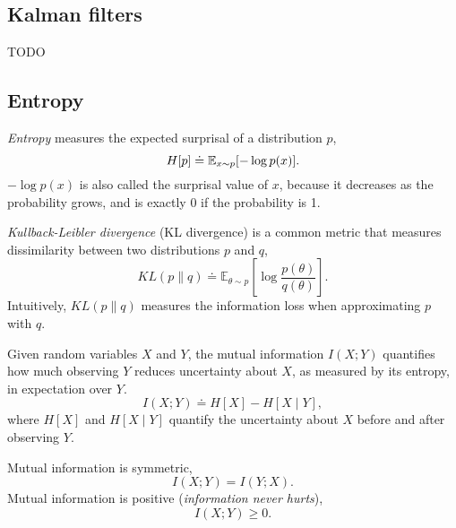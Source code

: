 \subsection{Kalman filters}

TODO

\subsection{Entropy}

\begin{definition}[Entropy]
  \textit{Entropy} measures the expected surprisal of a distribution $p$, \[
    H[p] \doteq \mathbb{E}_{x\sim p}[-\log p(x)]
  .\]
  $-\log p(x)$ is also called the surprisal value of $x$, because it decreases
  as the probability grows, and is exactly 0 if the probability is 1.
\end{definition}

\begin{definition}
  \textit{Kullback-Leibler divergence} (KL divergence) is a common metric that
  measures dissimilarity between two distributions $p$ and $q$, \[
    KL(p \| q) \doteq \mathbb{E}_{\theta\sim p} \left[ \log \frac{p(\theta)}{q(\theta)} \right]
  .\]
  Intuitively, $KL(p \| q)$ measures the information loss when approximating
  $p$ with $q$.
\end{definition}

\begin{definition}
  Given random variables $X$ and $Y$, the mutual information $I(X;Y)$
  quantifies how much observing $Y$ reduces uncertainty about $X$, as
  measured by its entropy, in expectation over $Y$. \[
    I(X;Y) \doteq H[X] - H[X \mid Y]
  ,\]
  where $H[X]$ and $H[X\mid Y]$ quantify the uncertainty about $X$ before and
  after observing $Y$.
\end{definition}

\begin{properties}
  Mutual information is symmetric, \[
    I(X;Y) = I(Y;X)
  .\]
  Mutual information is positive (\textit{information never hurts}), \[
    I(X;Y) \geq 0
  .\]
\end{properties}

